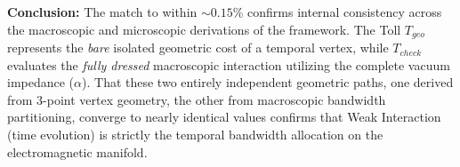 \textbf{Conclusion:} The match to within $\sim 0.15\%$ confirms internal consistency across the macroscopic and microscopic derivations of the framework. The Toll $T_{geo}$ represents the \textit{bare} isolated geometric cost of a temporal vertex, while $T_{check}$ evaluates the \textit{fully dressed} macroscopic interaction utilizing the complete vacuum impedance ($\alpha$). That these two entirely independent geometric paths, one derived from 3-point vertex geometry, the other from macroscopic bandwidth partitioning, converge to nearly identical values confirms that Weak Interaction (time evolution) is strictly the temporal bandwidth allocation on the electromagnetic manifold.